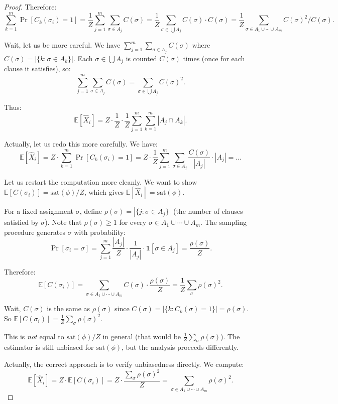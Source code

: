 \documentclass[twoside,12pt]{book}
\theoremstyle{plain}
\theoremstyle{definition}
\theoremstyle{remark}
\begin{document}
\begin{proof}
Therefore:
\[
\sum_{k=1}^m \Pr[C_k(\sigma_i) = 1] = \frac{1}{Z} \sum_{j=1}^m \sum_{\sigma \in A_j} C(\sigma) = \frac{1}{Z} \sum_{\sigma \in \bigcup A_j} C(\sigma) \cdot C(\sigma) = \frac{1}{Z} \sum_{\sigma \in A_1 \cup \cdots \cup A_m} C(\sigma)^2 / C(\sigma).
\]

Wait, let us be more careful. We have $\sum_{j=1}^m \sum_{\sigma \in A_j} C(\sigma)$ where $C(\sigma) = |\{k : \sigma \in A_k\}|$. Each $\sigma \in \bigcup A_j$ is counted $C(\sigma)$ times (once for each clause it satisfies), so:
\[
\sum_{j=1}^m \sum_{\sigma \in A_j} C(\sigma) = \sum_{\sigma \in \bigcup A_j} C(\sigma)^2.
\]

Thus:
\[
\mathbb{E}[\hat{X}_i] = Z \cdot \frac{1}{Z} \cdot \frac{1}{Z} \sum_{j=1}^m \sum_{k=1}^m |A_j \cap A_k|.
\]

Actually, let us redo this more carefully. We have:
\[
\mathbb{E}[\hat{X}_i] = Z \cdot \sum_{k=1}^m \Pr[C_k(\sigma_i) = 1] = Z \cdot \frac{1}{Z} \sum_{j=1}^m \sum_{\sigma \in A_j} \frac{C(\sigma)}{|A_j|} \cdot |A_j| = \ldots
\]

Let us restart the computation more cleanly. We want to show $\mathbb{E}[C(\sigma_i)] = \text{sat}(\phi)/Z$, which gives $\mathbb{E}[\hat{X}_i] = \text{sat}(\phi)$.

For a fixed assignment $\sigma$, define $\rho(\sigma) = |\{j : \sigma \in A_j\}|$ (the number of clauses satisfied by $\sigma$). Note that $\rho(\sigma) \geq 1$ for every $\sigma \in A_1 \cup \cdots \cup A_m$. The sampling procedure generates $\sigma$ with probability:
\[
\Pr[\sigma_i = \sigma] = \sum_{j=1}^m \frac{|A_j|}{Z} \cdot \frac{1}{|A_j|} \cdot \mathbf{1}[\sigma \in A_j] = \frac{\rho(\sigma)}{Z}.
\]

Therefore:
\[
\mathbb{E}[C(\sigma_i)] = \sum_{\sigma \in A_1 \cup \cdots \cup A_m} C(\sigma) \cdot \frac{\rho(\sigma)}{Z} = \frac{1}{Z} \sum_{\sigma} \rho(\sigma)^2.
\]

Wait, $C(\sigma)$ is the same as $\rho(\sigma)$ since $C(\sigma) = |\{k : C_k(\sigma) = 1\}| = \rho(\sigma)$. So $\mathbb{E}[C(\sigma_i)] = \frac{1}{Z} \sum_\sigma \rho(\sigma)^2$.

This is \emph{not} equal to $\text{sat}(\phi)/Z$ in general (that would be $\frac{1}{Z} \sum_\sigma \rho(\sigma)$). The estimator is still unbiased for $\text{sat}(\phi)$, but the analysis proceeds differently.

Actually, the correct approach is to verify unbiasedness directly. We compute:
\[
\mathbb{E}[\hat{X}_i] = Z \cdot \mathbb{E}[C(\sigma_i)] = Z \cdot \frac{\sum_\sigma \rho(\sigma)^2}{Z} = \sum_{\sigma \in A_1 \cup \cdots \cup A_m} \rho(\sigma)^2.
\]


\end{proof}
\end{document}
